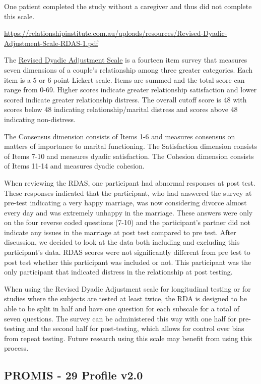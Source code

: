 \documentclass[
]{article}
\begin{document}
One patient completed the study without a caregiver and thus did not
complete this scale.

\url{https://relationshipinstitute.com.au/uploads/resources/Revised-Dyadic-Adjustment-Scale-RDAS-1.pdf}

The
\href{https://scholarsarchive.byu.edu/cgi/viewcontent.cgi?article=5608\&context=facpub}{Revised
Dyadic Adjustment Scale} is a fourteen item survey that measures seven
dimensions of a couple's relationship among three greater categories.
Each item is a 5 or 6 point Lickert scale. Items are summed and the
total score can range from 0-69. Higher scores indicate greater
relationship satisfaction and lower scored indicate greater relationship
distress. The overall cutoff score is 48 with scores below 48 indicating
relationship/marital distress and scores above 48 indicating
non-distress.

The Consensus dimension consists of Items 1-6 and measures consensus on
matters of importance to marital functioning. The Satisfaction dimension
consists of Items 7-10 and measures dyadic satisfaction. The Cohesion
dimension consists of Items 11-14 and measures dyadic cohesion.

When reviewing the RDAS, one participant had abnormal responses at post
test. These responses indicated that the participant, who had answered
the survey at pre-test indicating a very happy marriage, was now
considering divorce almost every day and was extremely unhappy in the
marriage. These answers were only on the four reverse coded questions
(7-10) and the participant's partner did not indicate any issues in the
marriage at post test compared to pre test. After discussion, we decided
to look at the data both including and excluding this participant's
data. RDAS scores were not significantly different from pre test to post
test whether this participant was included or not. This participant was
the only participant that indicated distress in the relationship at post
testing.

When using the Revised Dyadic Adjustment scale for longitudinal testing
or for studies where the subjects are tested at least twice, the RDA is
designed to be able to be split in half and have one question for each
subscale for a total of seven questions. The survey can be administered
this way with one half for pre-testing and the second half for
post-testing, which allows for control over bias from repeat testing.
Future research using this scale may benefit from using this process.

\hypertarget{promis---29-profile-v2.0}{%
\subsection{PROMIS - 29 Profile v2.0}\label{promis---29-profile-v2.0}}
\end{document}
